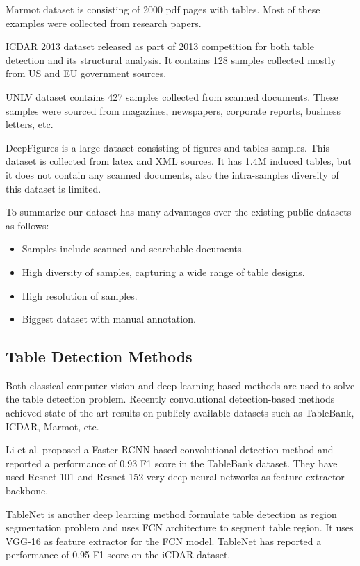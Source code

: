 \documentclass[a4paper,conference]{IEEEtran}
\begin{document}
Marmot \cite{marmot} dataset is consisting of 2000 pdf pages with tables. Most of these examples were collected from research papers. 




ICDAR 2013 \cite{icdar} dataset released as part of 2013 competition for both table detection and its structural analysis. It contains 128 samples collected mostly from US and EU government sources. 

UNLV \cite{unlv} dataset contains 427 samples collected from scanned documents. These samples were sourced from magazines, newspapers, corporate reports, business letters, etc. 

DeepFigures \cite{deepfigures} is a large dataset consisting of figures and tables samples. This dataset is collected from latex and XML sources. It has 1.4M induced tables, but it does not contain any scanned documents, also the intra-samples diversity of this dataset is limited. 



To summarize our dataset has many advantages over the existing public datasets as follows: 
\begin{itemize}
\item Samples include scanned and searchable documents. 
\item High diversity of samples, capturing a wide range of table designs.
\item High resolution of samples.
\item Biggest dataset with manual annotation.

\end{itemize}




\subsection{Table Detection Methods}
Both classical computer vision and deep learning-based methods are used to solve the table detection problem. Recently convolutional detection-based methods achieved state-of-the-art results on publicly available datasets such as TableBank, ICDAR, Marmot, etc. 

Li et al. \cite{tablebank} proposed a Faster-RCNN \cite{fasterrcnn} based convolutional detection method and reported a performance of 0.93 F1 score in the TableBank dataset. They have used Resnet-101 and Resnet-152 very deep neural networks as feature extractor backbone. 

TableNet \cite{tablenet} is another deep learning method formulate table detection as region segmentation problem and uses FCN architecture \cite{fcn} to segment table region. It uses VGG-16 \cite{vgg} as feature extractor for the FCN model. TableNet has reported a performance of 0.95 F1 score on the iCDAR dataset. 
\end{document}
